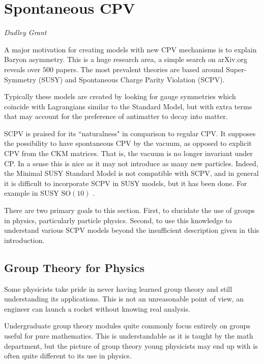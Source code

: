 \newpage

\section{Spontaneous CPV}
\vspace{-1.0em}
\begin{center}
\tiny{\textit{Dudley Grant}}
\end{center}

A major motivation for creating models with new CPV mechanisms is to explain Baryon asymmetry. This is a huge research area, a simple search on arXiv.org reveals over $500$ papers. The most prevalent theories are based around Super-Symmetry (SUSY) and Spontaneous Charge Parity Violation (SCPV).

Typically these models are created by looking for gauge symmetries which coincide with Lagrangians similar to the Standard Model, but with extra terms that may account for the preference of antimatter to decay into matter.

SCPV is praised for its ``naturalness" in comparison to regular CPV\cite{SCPV1}. It supposes the possibility to have spontaneous CPV by the vacuum, as opposed to explicit CPV from the CKM matrices. That is, the vacuum is no longer invariant under CP. In a sense this is nice as it may not introduce as many new particles. Indeed, the Minimal SUSY Standard Model is not compatible with SCPV, and in general it is difficult to incorporate SCPV in SUSY models\cite{SCPV1}, but it has been done. For example in SUSY $\mathrm{SO}(10)$ \cite{SCPV2}.

There are two primary goals to this section. First, to elucidate the use of groups in physics, particularly particle physics. Second, to use this knowledge to understand various SCPV models beyond the insufficient description given in this introduction.

\subsection{Group Theory for Physics}
Some physicists take pride in never having learned group theory and still understanding its applications. This is not an unreasonable point of view, an engineer can launch a rocket without knowing real analysis.

Undergraduate group theory modules quite commonly focus entirely on groups useful for pure mathematics. This is understandable as it is taught by the math department, but the picture of group theory young physicists may end up with is often quite different to its use in physics.


